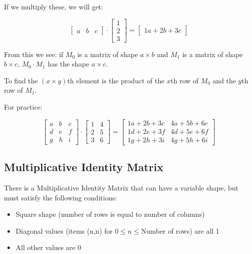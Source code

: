\documentclass[11pt,fleqn]{article}
\theoremstyle{definition}
\begin{document}
If we multiply these, we will get:

\[
    \begin{bmatrix}
        a & b & c
    \end{bmatrix} \cdot
    \begin{bmatrix}
        1 \\
        2 \\
        3
    \end{bmatrix}
    =
    \begin{bmatrix}
        1a + 2b + 3c
    \end{bmatrix}
\]

From this we see: if $M_0$ is a matrix of shape $a \times b$ and $M_1$ is a matrix of
shape $b \times c$, $M_0 \cdot M_1$ has the shape $a \times c$.

To find the $(x \times y)$th element is the product of the $x$th row of $M_0$ and the
$y$th row of $M_1$.

For practice:

\[
    \begin{bmatrix}
        a & b & c \\
        d & e & f \\
        g & h & i
    \end{bmatrix} \cdot
    \begin{bmatrix}
        1 & 4 \\
        2 & 5 \\
        3 & 6
    \end{bmatrix}
    =
    \begin{bmatrix}
        1a + 2b + 3c & 4a + 5b + 6c \\
        1d + 2e + 3f & 4d + 5e + 6f \\
        1g + 2h + 3i & 4g + 5h + 6i
    \end{bmatrix}
\]

\subsection{Multiplicative Identity Matrix}

There is a Multiplicative Identity Matrix that can have a variable shape, but must
satisfy the following conditions:

\begin{itemize}
    \item Square shape (number of rows is equal to number of columns)
    \item Diagonal values (items (n,n) for $0 \leq n \leq $Number of rows) are all 1
    \item All other values are 0
\end{itemize}
\end{document}
